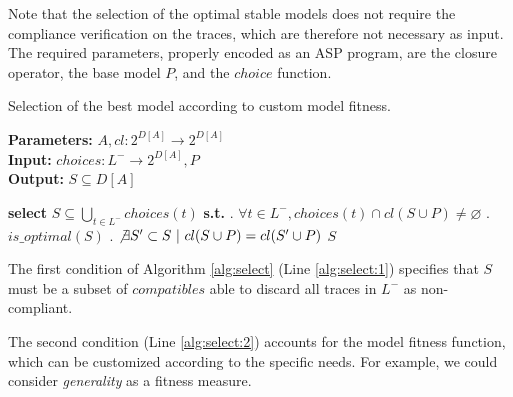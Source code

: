 Note that the selection of the optimal stable models does not require the compliance verification on the traces, which are therefore not necessary as input. The required parameters, properly encoded as an \ac{ASP} program, are the closure operator, the base model $P$, and the $choice$ function.



\begin{algorithm}
    \caption{Selection of the best model according to custom model fitness.}
    \label{alg:select}
    \textbf{Parameters:} $A, {cl}: 2^{D[A]} \rightarrow 2^{D[A]}$\\
    \textbf{Input:}  ${choices} : L^- \rightarrow 2^{D[A]}, P$\\
    \textbf{Output:} $S \subseteq D[A]$
	\begin{algorithmic}[1] 
	\State \textbf{select} $S \subseteq \bigcup_{t\in L^-} {choices}(t)$ \textbf{s.t.} \label{alg:subsetC}
	\Indent
		. $\forall t \in L^-, {choices}(t) \cap {cl}(S \cup P) \neq \varnothing$ 	\label{alg:select:1}
		. $is\_optimal(S)$									\label{alg:select:2}
		. $\not\exists S' \subset S ~|~ {cl}(S \cup P) = {cl}(S' \cup P)$		\label{alg:select:3}
	\EndIndent
	\State \Return $S$
    \EndProcedure
    \end{algorithmic}
\end{algorithm}



The first condition of Algorithm \ref{alg:select} (Line \ref{alg:select:1}) specifies that $S$ must be a subset of ${compatibles}$ able to discard all traces in $L^-$ as non-compliant.

The second condition (Line \ref{alg:select:2}) accounts for the model fitness function, which can be customized according to the specific needs. For example, we could consider \emph{generality} as a fitness measure. 
%


